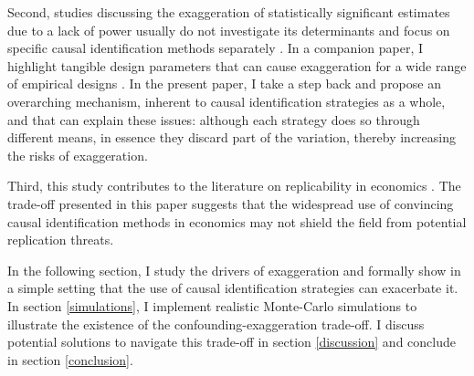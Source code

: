 			Second, studies discussing the exaggeration of statistically significant estimates due to a lack of power usually do not investigate its determinants and focus on specific causal identification methods separately \citep{ioannidis_power_2017, schell_evaluating_2018, ferraro_featureis_2020, black_simulated_2021, stommes_reliability_2021, young_leverage_2021}.  In a companion paper, I highlight tangible design parameters that can cause exaggeration for a wide range of empirical designs \citep{bagilet_accurately_2023}. In the present paper, I take a step back and propose an overarching mechanism, inherent to causal identification strategies as a whole, and that can explain these issues: although each strategy does so through different means, in essence they discard part of the variation, thereby increasing the risks of exaggeration. %
			
			Third, this study contributes to the literature on replicability in economics \citep{camerer_evaluating_2016, ioannidis_power_2017, christensen_transparency_2018, kasy_forking_2021}. The trade-off presented in this paper suggests that the widespread use of convincing causal identification methods in economics may not shield the field from potential replication threats.
			
			In the following section, I study the drivers of exaggeration and formally show in a simple setting that the use of causal identification strategies can exacerbate it. In section  \ref{simulations}, I implement realistic Monte-Carlo simulations to illustrate the existence of the confounding-exaggeration trade-off. I discuss potential solutions to navigate this trade-off in section \ref{discussion} and conclude in section \ref{conclusion}.
	
	
		